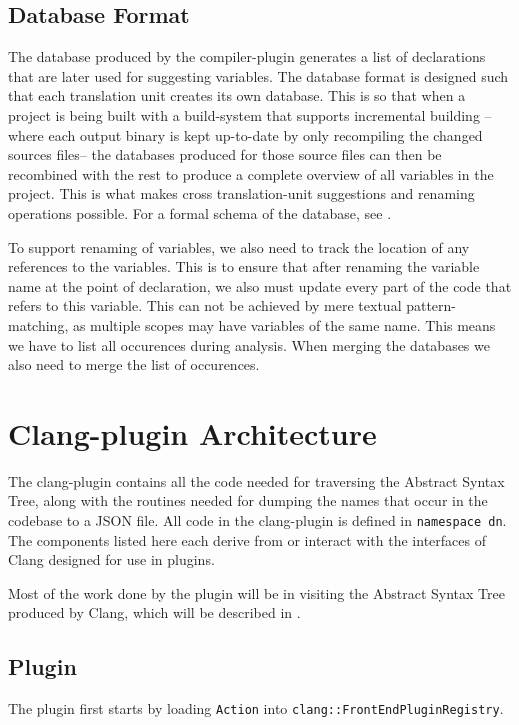\subsection{Database Format}
\label{sec:dbfmt}
The database produced by the compiler-plugin generates a list of declarations
that are later used for suggesting variables.
The database format is designed such that each translation unit creates its own
database. This is so that when a project is being built with a build-system that
supports incremental building --where each output binary is kept up-to-date by
only recompiling the changed sources files-- the databases produced for those
source files can then be recombined with the rest to produce a complete overview
of all variables in the project.  This is what makes cross translation-unit
suggestions and renaming operations possible. For a formal schema of the
database, see .

To support renaming of variables, we also need to track the location of any
references to the variables. This is to ensure that after renaming the
variable name at the point of declaration, we also must update every part of the
code that refers to this variable. This can not be achieved by mere textual
pattern-matching, as multiple scopes may have variables of the same name. This
means we have to list all occurences during analysis. When merging the databases
we also need to merge the list of occurences.

\section{Clang-plugin Architecture}

The clang-plugin contains all the code needed for traversing the Abstract
Syntax Tree, along with the routines needed for dumping the names that occur in
the codebase to a JSON file. All code in the clang-plugin is defined in
\lstinline|namespace dn|. The components listed here each derive from or
interact with the interfaces of Clang designed for use in plugins.

Most of the work done by the plugin will be in visiting the Abstract Syntax Tree
produced by Clang, which will be described in .

\subsection{Plugin}
The plugin first starts by loading \lstinline|Action| into
\lstinline|clang::FrontEndPluginRegistry|.

